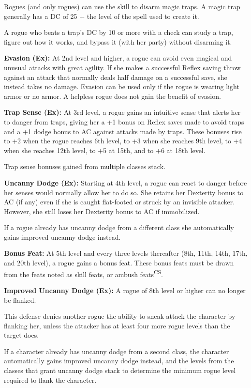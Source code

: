 Rogues (and only rogues) can use the  skill to disarm magic traps. A magic trap generally has a DC of 25 + the level of the spell used to create it.

A rogue who beats a trap's DC by 10 or more with a  check can study a trap, figure out how it works, and bypass it (with her party) without disarming it.

\textbf{Evasion (Ex):} At 2nd level and higher, a rogue can avoid even magical and unusual attacks with great agility. If she makes a successful Reflex saving throw against an attack that normally deals half damage on a successful save, she instead takes no damage. Evasion can be used only if the rogue is wearing light armor or no armor. A helpless rogue does not gain the benefit of evasion.

\textbf{Trap Sense (Ex):} At 3rd level, a rogue gains an intuitive sense that alerts her to danger from traps, giving her a +1 bonus on Reflex saves made to avoid traps and a +1 dodge bonus to AC against attacks made by traps. These bonuses rise to +2 when the rogue reaches 6th level, to +3 when she reaches 9th level, to +4 when she reaches 12th level, to +5 at 15th, and to +6 at 18th level.

Trap sense bonuses gained from multiple classes stack.

\textbf{Uncanny Dodge (Ex):} Starting at 4th level, a rogue can react to danger before her senses would normally allow her to do so. She retains her Dexterity bonus to AC (if any) even if she is caught flat-footed or struck by an invisible attacker. However, she still loses her Dexterity bonus to AC if immobilized.

If a rogue already has uncanny dodge from a different class she automatically gains improved uncanny dodge instead.

\textbf{Bonus Feat:} At 5th level and every three levels thereafter (8th, 11th, 14th, 17th, and 20th level), a rogue gains a bonus feat. These bonus feats must be drawn from the feats noted as skill feats, or ambush feats\textsuperscript{CS}.

\textbf{Improved Uncanny Dodge (Ex):} A rogue of 8th level or higher can no longer be flanked.

This defense denies another rogue the ability to sneak attack the character by flanking her, unless the attacker has at least four more rogue levels than the target does.

If a character already has uncanny dodge from a second class, the character automatically gains improved uncanny dodge instead, and the levels from the classes that grant uncanny dodge stack to determine the minimum rogue level required to flank the character.

